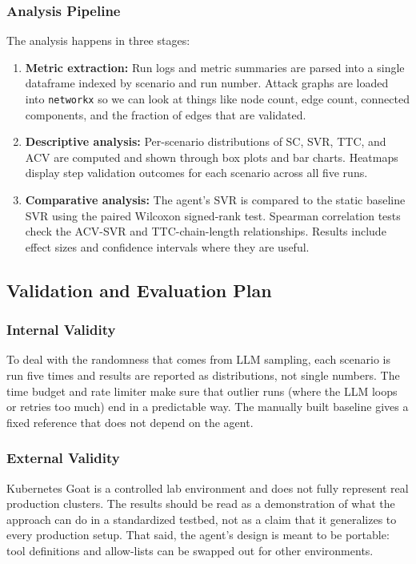\documentclass[conference]{IEEEtran}
\begin{document}
\subsubsection{Analysis Pipeline}
The analysis happens in three stages:
\begin{enumerate}
    \item \textbf{Metric extraction:} Run logs and metric summaries are parsed into a single dataframe indexed by scenario and run number. Attack graphs are loaded into \texttt{networkx} so we can look at things like node count, edge count, connected components, and the fraction of edges that are validated.
    \item \textbf{Descriptive analysis:} Per-scenario distributions of SC, SVR, TTC, and ACV are computed and shown through box plots and bar charts. Heatmaps display step validation outcomes for each scenario across all five runs.
    \item \textbf{Comparative analysis:} The agent's SVR is compared to the static baseline SVR using the paired Wilcoxon signed-rank test. Spearman correlation tests check the ACV-SVR and TTC-chain-length relationships. Results include effect sizes and confidence intervals where they are useful.
\end{enumerate}

\subsection{Validation and Evaluation Plan}

\subsubsection{Internal Validity}
To deal with the randomness that comes from LLM sampling, each scenario is run five times and results are reported as distributions, not single numbers. The time budget and rate limiter make sure that outlier runs (where the LLM loops or retries too much) end in a predictable way. The manually built baseline gives a fixed reference that does not depend on the agent.

\subsubsection{External Validity}
Kubernetes Goat is a controlled lab environment and does not fully represent real production clusters. The results should be read as a demonstration of what the approach can do in a standardized testbed, not as a claim that it generalizes to every production setup. That said, the agent's design is meant to be portable: tool definitions and allow-lists can be swapped out for other environments.
\end{document}
